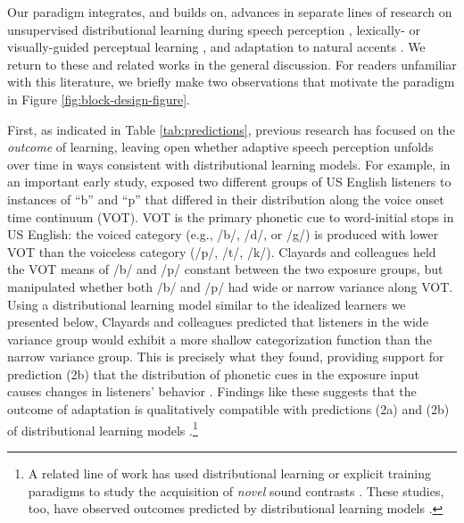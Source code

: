 \documentclass[
  11pt,
  man,mask,floatsintext]{apa6}
\begin{document}
Our paradigm integrates, and builds on, advances in separate lines of research on unsupervised distributional learning during speech perception \autocite{clayards2008,colby2018,kleinschmidt2020,theodore-monto2019}, lexically- or visually-guided perceptual learning \autocite{cummings-theodore2023,kleinschmidt-jaeger2012,vroomen2007}, and adaptation to natural accents \autocite{hitczenko-feldman2016,tan2021,xie2021cognition}. We return to these and related works in the general discussion. For readers unfamiliar with this literature, we briefly make two observations that motivate the paradigm in Figure \ref{fig:block-design-figure}.

First, as indicated in Table \ref{tab:predictions}, previous research has focused on the \emph{outcome} of learning, leaving open whether adaptive speech perception unfolds over time in ways consistent with distributional learning models. For example, in an important early study, \textcite{clayards2008} exposed two different groups of US English listeners to instances of ``b'' and ``p'' that differed in their distribution along the voice onset time continuum (VOT). VOT is the primary phonetic cue to word-initial stops in US English: the voiced category (e.g., /b/, /d/, or /g/) is produced with lower VOT than the voiceless category (/p/, /t/, /k/). Clayards and colleagues held the VOT means of /b/ and /p/ constant between the two exposure groups, but manipulated whether both /b/ and /p/ had wide or narrow variance along VOT. Using a distributional learning model similar to the idealized learners we presented below, Clayards and colleagues predicted that listeners in the wide variance group would exhibit a more shallow categorization function than the narrow variance group. This is precisely what they found, providing support for prediction (2b) that the distribution of phonetic cues in the exposure input causes changes in listeners' behavior \autocites[see also][]{nixon2016,theodore-monto2019}. Findings like these suggests that the outcome of adaptation is qualitatively compatible with predictions (2a) and (2b) of distributional learning models \autocites[see also][]{hitczenko-feldman2016,tan2021,xie2021cognition}.\footnote{A related line of work has used distributional learning or explicit training paradigms to study the acquisition of \emph{novel} sound contrasts \autocites[e.g.,][]{maye2002,mcclelland1999,pajak-levy2012,pisoni1982}. These studies, too, have observed outcomes predicted by distributional learning models \autocite[for review, see][]{pajak2016}.}
\end{document}
